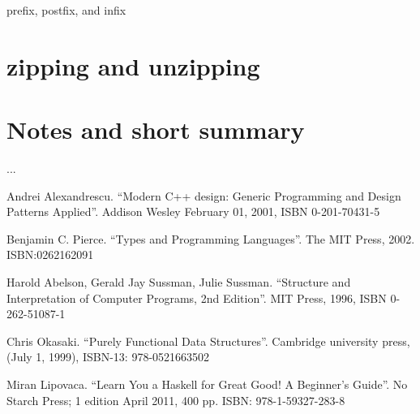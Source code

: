 \documentclass{article}
\begin{document}
prefix, postfix, and infix

\section{zipping and unzipping}

\section{Notes and short summary}
...


\begin{thebibliography}{99}

Andrei Alexandrescu. ``Modern C++ design: Generic Programming and Design Patterns Applied''. Addison Wesley February 01, 2001, ISBN 0-201-70431-5

Benjamin C. Pierce. ``Types and Programming Languages''. The MIT Press, 2002. ISBN:0262162091

Harold Abelson, Gerald Jay Sussman, Julie Sussman. ``Structure and Interpretation of Computer Programs, 2nd Edition''. MIT Press, 1996, ISBN 0-262-51087-1

Chris Okasaki. ``Purely Functional Data Structures''. Cambridge university press, (July 1, 1999), ISBN-13: 978-0521663502

Miran Lipovaca. ``Learn You a Haskell for Great Good! A Beginner's Guide''. No Starch Press; 1 edition April 2011, 400 pp. ISBN: 978-1-59327-283-8

\end{thebibliography}

\ifx\wholebook\relax \else
\end{document}
